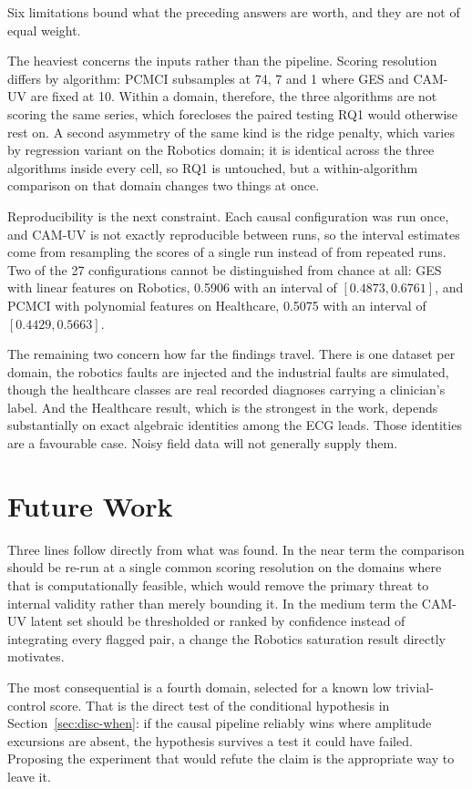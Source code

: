 Six limitations bound what the preceding answers are worth, and they are not of equal weight.

The heaviest concerns the inputs rather than the pipeline. Scoring resolution differs by algorithm: PCMCI subsamples at 74, 7 and 1 where GES and CAM-UV are fixed at 10. Within a domain, therefore, the three algorithms are not scoring the same series, which forecloses the paired testing RQ1
would otherwise rest on. A second asymmetry of the same kind is the ridge penalty, which varies by regression variant on the Robotics domain; it is identical across the three algorithms inside every cell, so RQ1 is untouched, but a within-algorithm comparison on that domain changes two things at once.

Reproducibility is the next constraint. Each causal configuration was run once, and CAM-UV is not exactly reproducible between runs, so the interval estimates come from resampling the scores of a single run instead of from repeated runs. Two of the 27 configurations cannot be distinguished from chance at all: GES with linear features on Robotics, 0.5906 with an interval of $[0.4873, 0.6761]$, and PCMCI with polynomial features on Healthcare, 0.5075 with an interval of $[0.4429, 0.5663]$.

The remaining two concern how far the findings travel. There is one dataset per domain, the robotics faults are injected and the industrial faults are simulated, though the healthcare classes are real recorded diagnoses carrying a clinician's label. And the Healthcare result, which is the strongest in the work, depends substantially on exact algebraic identities among the ECG leads. Those identities are a favourable case. Noisy field data will not generally supply them.

\section{Future Work}
\label{sec:conc-future}

Three lines follow directly from what was found. In the near term the comparison should be re-run at a single common scoring resolution on the domains where that is computationally feasible, which would remove the primary threat to internal validity rather than merely bounding it. In the medium term the CAM-UV latent set should be thresholded or ranked by confidence instead of integrating every flagged pair, a change the Robotics saturation result directly motivates.

The most consequential is a fourth domain, selected for a known low trivial-control score. That is the direct test of the conditional hypothesis in Section~\ref{sec:disc-when}: if the causal pipeline reliably wins where amplitude excursions are absent, the hypothesis survives a test it could have failed. Proposing the experiment that would refute the claim is the appropriate way to leave it.

